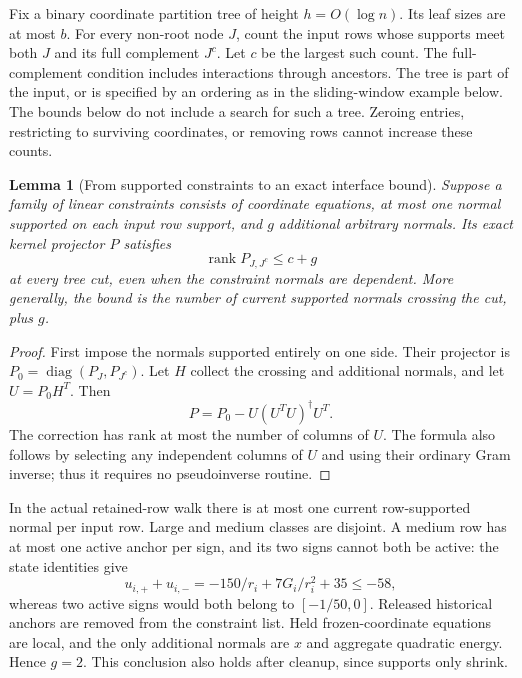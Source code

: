 \documentclass[11pt]{amsart}
\newtheorem{lemma}[theorem]{Lemma}
\theoremstyle{definition}\newtheorem{definition}[theorem]{Definition}
\theoremstyle{remark}\newtheorem{remark}[theorem]{Remark}
\numberwithin{equation}{section}
\begin{document}
Fix a binary coordinate partition tree of height $h=O(\log n)$. Its leaf
sizes are at most $b$. For every non-root node $J$, count the input rows whose
supports meet both $J$ and its full complement $J^c$. Let $c$ be the largest
such count. The full-complement condition includes interactions through
ancestors. The tree is part of the input, or is specified by an ordering as
in the sliding-window example below. The bounds below do not include a search for such a tree.
Zeroing entries, restricting to surviving coordinates, or removing rows
cannot increase these counts.

\begin{lemma}[From supported constraints to an exact interface bound]
\label{ifc:lem:supportprojector}
Suppose a family of linear constraints consists of coordinate equations,
at most one normal supported on each input row support, and $g$ additional
arbitrary normals. Its exact kernel projector $P$ satisfies
\[
 \operatorname{rank}P_{J,J^c}\le c+g
\]
at every tree cut, even when the constraint normals are dependent.
More generally, the bound is the number of current supported normals
crossing the cut, plus $g$.
\end{lemma}
\begin{proof}
First impose the normals supported entirely on one side. Their projector
is $P_0=\operatorname{diag}(P_J,P_{J^c})$. Let $H$ collect the crossing and
additional normals, and let $U=P_0H^T$. Then
\[
 P=P_0-U(U^TU)^\dagger U^T.
\]
The correction has rank at most the number of columns of $U$. The formula
also follows by selecting any independent columns of $U$ and using their
ordinary Gram inverse; thus it requires no pseudoinverse routine.
\end{proof}

In the actual retained-row walk there is at most one current row-supported
normal per input row. Large and medium classes are disjoint. A medium
row has at most one active anchor per sign, and its two signs cannot both
be active: the state identities give
\[
 u_{i,+}+u_{i,-}
 =-150/r_i+7G_i/r_i^2+35\le-58,
\]
whereas two active signs would both belong to $[-1/50,0]$.
Released historical anchors are removed from the constraint list.
Held frozen-coordinate equations are local, and the only additional
normals are $x$ and aggregate quadratic energy. Hence $g=2$.
This conclusion also holds after cleanup, since supports only shrink.
\end{document}
